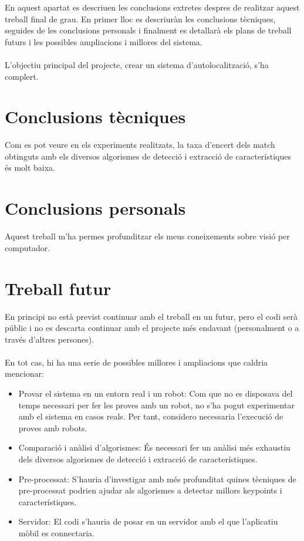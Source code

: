 En aquest apartat es descriuen les conclusions extretes despres de realitzar aquest treball final de grau. En primer lloc es descriuràn les conclusions tècniques, seguides de les conclusions personals
i finalment es detallarà els plans de treball futurs i les possibles ampliacions i millores del sistema.\\\\
L'objectiu principal del projecte, crear un sistema d'autolocalització, s'ha complert.

\section{Conclusions tècniques}
	Com es pot veure en els experiments realitzats, la taxa d'encert dels match obtinguts amb els diversos algorismes de detecció i extracció de característiques és molt baixa.
\section{Conclusions personals}
	Aquest treball m'ha permes profunditzar els meus coneixements sobre visió per computador.

\newpage
\section{Treball futur}
	En principi no està previst continuar amb el treball en un futur, pero el codi serà públic i no es descarta continuar amb el projecte més endavant (personalment o a través d'altres persones).\\\\
	En tot cas, hi ha una serie de possibles millores i ampliacions que caldria mencionar:\\
	
	\begin{itemize}
		\item{Provar el sistema en un entorn real i un robot: Com que no es disposava del temps necessari per fer les proves amb un robot, no s'ha pogut experimentar amb el sistema en casos reals. Per tant,
		considero necessaria l'execució de proves amb robots.}
		\item{Comparació i anàlisi d'algorismes: És necessari fer un anàlisi més exhaustiu dels diversos algorismes de detecció i extracció de característiques.}
		\item{Pre-processat: S'hauria d'investigar amb més profunditat quines tècniques de pre-processat podrien ajudar als algorismes a detectar millors keypoints i característiques.}
		\item{Servidor: El codi s'hauria de posar en un servidor amb el que l'aplicatiu mòbil es connectaria.}
	\end{itemize}
